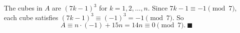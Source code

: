 The cubes in $A$ are $(7k-1)^3$ for $k=1,2,\dots,n$. Since $7k-1\equiv-1\pmod7$, each cube satisfies $(7k-1)^3\equiv(-1)^3=-1\pmod7$. So
\[A\equiv n\cdot(-1)+15n=14n\equiv0\pmod7.\ \blacksquare\]
